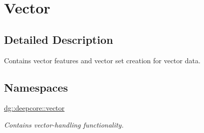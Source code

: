 \hypertarget{group___vector_module}{}\section{Vector}
\label{group___vector_module}


\subsection{Detailed Description}
Contains vector features and vector set creation for vector data. 

\subsection*{Namespaces}
\begin{DoxyCompactItemize}
\item 
 \hyperlink{namespacedg_1_1deepcore_1_1vector}{dg\+::deepcore\+::vector}
\begin{DoxyCompactList}\small\item\em Contains vector-\/handling functionality. \end{DoxyCompactList}\end{DoxyCompactItemize}
